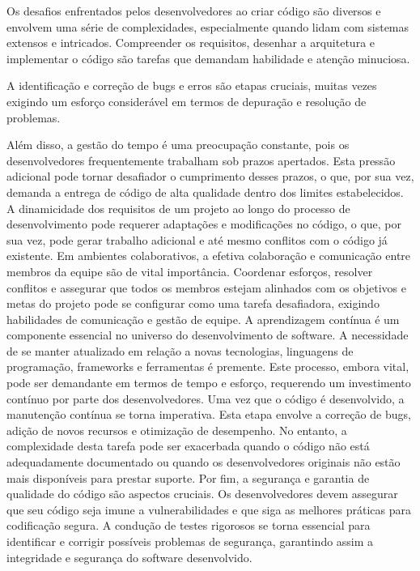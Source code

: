 
Os desafios enfrentados pelos desenvolvedores ao criar código são diversos e envolvem uma série de complexidades, especialmente quando lidam com sistemas extensos e intricados. Compreender os requisitos, desenhar a arquitetura e implementar o código são tarefas que demandam habilidade e atenção minuciosa. \cite{CogniCrypt}

A identificação e correção de bugs e erros são etapas cruciais, muitas vezes exigindo um esforço considerável em termos de depuração e resolução de problemas. \cite{CogniCrypt}

Além disso, a gestão do tempo é uma preocupação constante, pois os desenvolvedores frequentemente trabalham sob prazos apertados. Esta pressão adicional pode tornar desafiador o cumprimento desses prazos, o que, por sua vez, demanda a entrega de código de alta qualidade dentro dos limites estabelecidos.
A dinamicidade dos requisitos de um projeto ao longo do processo de desenvolvimento pode requerer adaptações e modificações no código, o que, por sua vez, pode gerar trabalho adicional e até mesmo conflitos com o código já existente.
Em ambientes colaborativos, a efetiva colaboração e comunicação entre membros da equipe são de vital importância. Coordenar esforços, resolver conflitos e assegurar que todos os membros estejam alinhados com os objetivos e metas do projeto pode se configurar como uma tarefa desafiadora, exigindo habilidades de comunicação e gestão de equipe.
A aprendizagem contínua é um componente essencial no universo do desenvolvimento de software. A necessidade de se manter atualizado em relação a novas tecnologias, linguagens de programação, frameworks e ferramentas é premente. Este processo, embora vital, pode ser demandante em termos de tempo e esforço, requerendo um investimento contínuo por parte dos desenvolvedores.
Uma vez que o código é desenvolvido, a manutenção contínua se torna imperativa. Esta etapa envolve a correção de bugs, adição de novos recursos e otimização de desempenho. No entanto, a complexidade desta tarefa pode ser exacerbada quando o código não está adequadamente documentado ou quando os desenvolvedores originais não estão mais disponíveis para prestar suporte.
Por fim, a segurança e garantia de qualidade do código são aspectos cruciais. Os desenvolvedores devem assegurar que seu código seja imune a vulnerabilidades e que siga as melhores práticas para codificação segura. A condução de testes rigorosos se torna essencial para identificar e corrigir possíveis problemas de segurança, garantindo assim a integridade e segurança do software desenvolvido.

